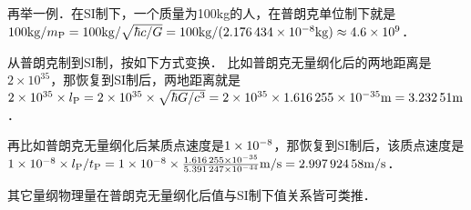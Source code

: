 再举一例．在SI制下，一个质量为\num{100}\si{kg}的人，在普朗克单位制下就是
$\num{100}\si{kg}/m_{\rm P}
=  \num{100}\si{kg}/\sqrt{\hbar c/G}
= \num{100}\si{kg}/(\num{2.176434d-8}\si{kg} )\approx \num{4.6e9} $．

从普朗克制到SI制，按如下方式变换．
比如普朗克无量纲化后的两地距离是$2\times 10^{35}$，那恢复到SI制后，两地距离就是
$2\times 10^{35}\times l_{\rm{P}}=2\times 10^{35}\times \sqrt{\hbar G/c^3} =
2\times 10^{35}\times \num{1.616255d-35} \si{m} = \num{3.23251} \si{m}$．

再比如普朗克无量纲化后某质点速度是$\num{1d-8}$，那恢复到SI制后，该质点速度是
$\num{1d-8}\times l_{\rm P }/t_{\rm P}
= \num{1d-8} \times \frac{\num{1.616255d-35}}{\num{5.391247d-44}} \si{m/s}
= \num{2.99792458}\si{m/s}$．

其它量纲物理量在普朗克无量纲化后值与SI制下值关系皆可类推．


